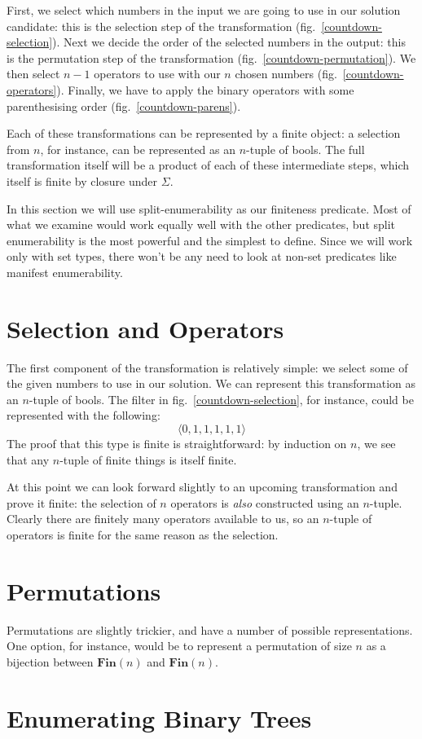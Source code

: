 First, we select which numbers in the input we are going to use in our solution
candidate: this is the selection step of the transformation
(fig.~\ref{countdown-selection}).
Next we decide the order of the selected numbers in the output: this is the
permutation step of the transformation (fig.~\ref{countdown-permutation}).
We then select \(n-1\) operators to use with our \(n\) chosen numbers
(fig.~\ref{countdown-operators}).
Finally, we have to apply the binary operators with some parenthesising order
(fig.~\ref{countdown-parens}).

Each of these transformations can be represented by a finite object: a selection
from \(n\), for instance, can be represented as an \(n\)-tuple of bools.
The full transformation itself will be a product of each of these intermediate
steps, which itself is finite by closure under \(\Sigma\).

In this section we will use split-enumerability as our finiteness predicate.
Most of what we examine would work equally well with the other predicates, but
split enumerability is the most powerful and the simplest to define.
Since we will work only with set types, there won't be any need to look at
non-set predicates like manifest enumerability.
\section{Selection and Operators}
The first component of the transformation is relatively simple: we select some
of the given numbers to use in our solution.
We can represent this transformation as an \(n\)-tuple of bools.
The filter in fig.~\ref{countdown-selection}, for instance, could be represented
with the following:
\begin{equation}
  \langle 0 , 1 , 1 , 1 , 1 , 1  \rangle
\end{equation}
The proof that this type is finite is straightforward: by induction on \(n\), we
see that any \(n\)-tuple of finite things is itself finite.

At this point we can look forward slightly to an upcoming transformation and
prove it finite: the selection of \(n\) operators is \emph{also} constructed
using an \(n\)-tuple.
Clearly there are finitely many operators available to us, so an \(n\)-tuple of
operators is finite for the same reason as the selection.
\section{Permutations}
Permutations are slightly trickier, and have a number of possible
representations.
One option, for instance, would be to represent a permutation of size \(n\) as a
bijection between \(\mathbf{Fin}(n)\) and \(\mathbf{Fin}(n)\).


\section{Enumerating Binary Trees}




